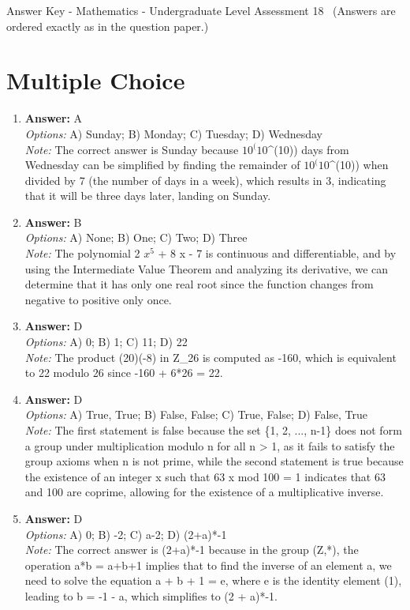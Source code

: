 \documentclass[12pt]{article}
\begin{document}
\begin{center}
Answer Key - Mathematics - Undergraduate Level Assessment 18 \
\small (Answers are ordered exactly as in the question paper.)
\end{center}

\section*{Multiple Choice}
\begin{enumerate}[label=\arabic*.]
\item \textbf{Answer:} A
\\ \textit{Options:} A) Sunday; B) Monday; C) Tuesday; D) Wednesday
\\ \textit{Note:} The correct answer is Sunday because $10^(10$^(10)) days from Wednesday can be simplified by finding the remainder of $10^(10$^(10)) when divided by 7 (the number of days in a week), which results in 3, indicating that it will be three days later, landing on Sunday.
\item \textbf{Answer:} B
\\ \textit{Options:} A) None; B) One; C) Two; D) Three
\\ \textit{Note:} The polynomial 2 $x^5$ + 8 x - 7 is continuous and differentiable, and by using the Intermediate Value Theorem and analyzing its derivative, we can determine that it has only one real root since the function changes from negative to positive only once.
\item \textbf{Answer:} D
\\ \textit{Options:} A) 0; B) 1; C) 11; D) 22
\\ \textit{Note:} The product (20)(-8) in Z\_26 is computed as -160, which is equivalent to 22 modulo 26 since -160 + 6*26 = 22.
\item \textbf{Answer:} D
\\ \textit{Options:} A) True, True; B) False, False; C) True, False; D) False, True
\\ \textit{Note:} The first statement is false because the set \{1, 2, ..., n-1\} does not form a group under multiplication modulo n for all n \textgreater{} 1, as it fails to satisfy the group axioms when n is not prime, while the second statement is true because the existence of an integer x such that 63 x mod 100 = 1 indicates that 63 and 100 are coprime, allowing for the existence of a multiplicative inverse.
\item \textbf{Answer:} D
\\ \textit{Options:} A) 0; B) -2; C) a-2; D) (2+a)*-1
\\ \textit{Note:} The correct answer is (2+a)*-1 because in the group (Z,*), the operation a*b = a+b+1 implies that to find the inverse of an element a, we need to solve the equation a + b + 1 = e, where e is the identity element (1), leading to b = -1 - a, which simplifies to (2 + a)*-1.
\end{enumerate}
\end{document}
